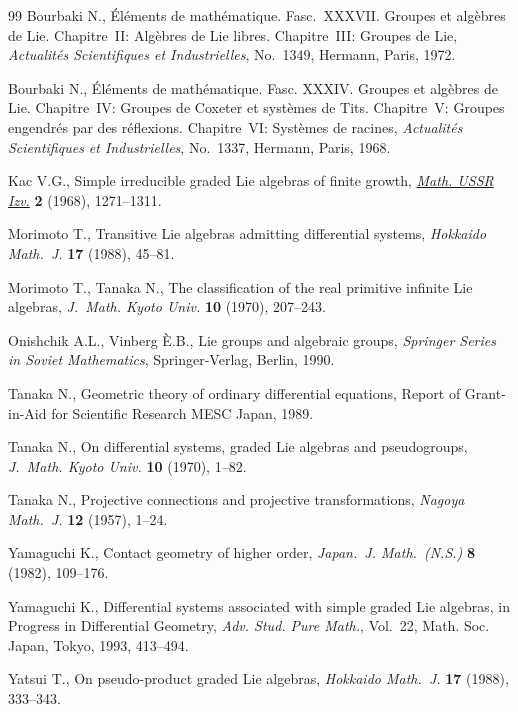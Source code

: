 \documentclass[11pt]{article}
\numberwithin{equation}{section}
\numberwithin{theorem}{section}
\numberwithin{proposition}{section}
\numberwithin{lemma}{section}
\numberwithin{corollary}{section}
\numberwithin{definition}{section}
\numberwithin{example}{section}
\numberwithin{remark}{section}
\numberwithin{note}{section}
\begin{document}
\begin{thebibliography}{99}
Bourbaki N., \'{E}l\'ements de math\'ematique. Fasc.~XXXVII. {G}roupes et
  alg\`ebres de {L}ie. {C}hapitre~{II}: Alg\`ebres de Lie libres.
  {C}hapitre~{III}: Groupes de Lie, \textit{Actualit\'es Scientifiques et
  Industrielles}, No.~1349, Hermann, Paris, 1972.

Bourbaki N., \'{E}l\'ements de math\'ematique. {F}asc. {XXXIV}. {G}roupes et
  alg\`ebres de {L}ie. {C}hapitre~{IV}: {G}roupes de {C}oxeter et syst\`emes de
  {T}its. {C}hapitre~{V}: {G}roupes engendr\'es par des r\'ef\/lexions.
  {C}hapitre~{VI}: Syst\`emes de racines, \textit{Actualit\'es Scientifiques et
  Industrielles}, No.~1337, Hermann, Paris, 1968.

Kac V.G., Simple irreducible graded {L}ie algebras of f\/inite growth,
  \href{http://dx.doi.org/10.1070/IM1968v002n06ABEH000729}{\textit{Math. USSR Izv.}} \textbf{2} (1968), 1271--1311.

Morimoto T., Transitive {L}ie algebras admitting dif\/ferential systems,
  \textit{Hokkaido Math.~J.} \textbf{17} (1988), 45--81.

Morimoto T., Tanaka N., The classif\/ication of the real primitive inf\/inite {L}ie
  algebras, \textit{J.~Math. Kyoto Univ.} \textbf{10} (1970), 207--243.

Onishchik A.L., Vinberg {\`E}.B., Lie groups and algebraic groups, \textit{Springer
Series in Soviet Mathematics}, Springer-Verlag, Berlin, 1990.

Tanaka N., Geometric theory of ordinary dif\/ferential equations, {R}eport of
  Grant-in-Aid for Scientif\/ic Research MESC Japan, 1989.

Tanaka N., On dif\/ferential systems, graded {L}ie algebras and pseudogroups,
  \textit{J.~Math. Kyoto Univ.} \textbf{10} (1970), 1--82.

Tanaka N., Projective connections and projective transformations,
  \textit{Nagoya Math.~J.} \textbf{12} (1957), 1--24.

Yamaguchi K., Contact geometry of higher order, \textit{Japan.~J. Math.~(N.S.)}
  \textbf{8} (1982), 109--176.

Yamaguchi K., Dif\/ferential systems associated with simple graded {L}ie
  algebras, in Progress in Dif\/ferential Geometry, \textit{Adv. Stud. Pure
  Math.}, Vol.~22, Math. Soc. Japan, Tokyo, 1993, 413--494.

Yatsui T., On pseudo-product graded {L}ie algebras, \textit{Hokkaido Math.~J.}
  \textbf{17} (1988), 333--343.

\end{thebibliography}
\end{document}
